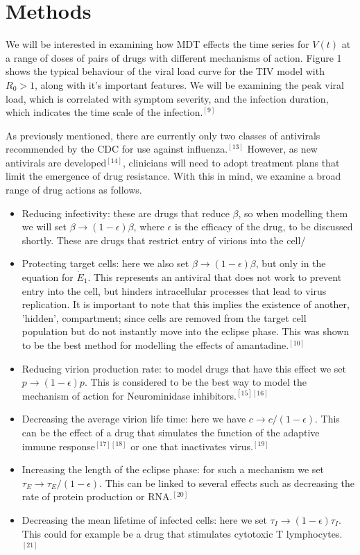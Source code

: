 \documentclass[a4paper,11pt]{article}
\begin{document}
\section*{Methods}
We will be interested in examining how MDT effects the time series for $V(t)$ at a range of doses of pairs of drugs with different mechanisms of action. Figure 1 shows the typical behaviour of the viral load curve for the TIV model with $R_0 > 1$, along with it's important features. We will be examining the peak viral load, which is correlated with symptom severity, and the infection duration, which indicates the time scale of the infection.$^{[9]}$

As previously mentioned, there are currently only two classes of antivirals recommended by the CDC for use against influenza.$^{[13]}$ However, as new antivirals are developed$^{[14]}$, clinicians will need to adopt treatment plans that limit the emergence of drug resistance. With this in mind, we examine a broad range of drug actions as follows.

\begin{itemize}
    \item Reducing infectivity: these are drugs that reduce $\beta$, so when modelling them we will set $\beta \rightarrow (1-\epsilon)\beta$, where $\epsilon$ is the efficacy of the drug, to be discussed shortly. These are drugs that restrict entry of virions into the cell/
    \item Protecting target cells: here we also set $\beta \rightarrow (1-\epsilon)\beta$, but only in the equation for $\dot{E}_1$. This represents an antiviral that does not work to prevent entry into the cell, but hinders intracellular processes that lead to virus replication. It is important to note that this implies the existence of another, 'hidden', compartment; since cells are removed from the target cell population but do not instantly move into the eclipse phase. This was shown to be the best method for modelling the effects of amantadine.$^{[10]}$
    \item Reducing virion production rate: to model drugs that have this effect we set $p \rightarrow (1-\epsilon)p$. This is considered to be the best way to model the mechanism of action for Neurominidase inhibitors.$^{[15][16]}$
    \item Decreasing the average virion life time: here we have $c \rightarrow c/(1-\epsilon)$. This can be the effect of a drug that simulates the function of the adaptive immune response$^{[17][18]}$ or one that inactivates virus.$^{[19]}$
    \item Increasing the length of the eclipse phase: for such a mechanism we set $\tau_E \rightarrow \tau_E/(1-\epsilon)$. This can be linked to several effects such as decreasing the rate of protein production or RNA.$^{[20]}$
    \item Decreasing the mean lifetime of infected cells: here we set $\tau_I \rightarrow (1-\epsilon)\tau_I$. This could for example be a drug that stimulates cytotoxic T lymphocytes.$^{[21]}$
\end{itemize}
\end{document}

